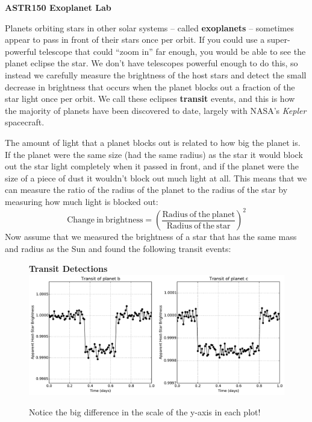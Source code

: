 \documentclass[12pt]{article}
\begin{document}

\begin{center}
\bf ASTR150 Exoplanet Lab
\end{center}

Planets orbiting stars in other solar systems -- called {\bf exoplanets} -- sometimes appear to pass in front of their stars once per orbit. If you could use a super-powerful telescope that could ``zoom in'' far enough, you would be able to see the planet eclipse the star. We don't have telescopes powerful enough to do this, so instead we carefully measure the brightness of the host stars and detect the small decrease in brightness that occurs when the planet blocks out a fraction of the star light once per orbit.  We call these eclipses {\bf transit} events, and this is how the majority of planets have been discovered to date, largely with NASA's {\it Kepler} spacecraft. 

The amount of light that a planet blocks out is related to how big the planet is. If the planet were the same size (had the same radius) as the star it would block out the star light completely when it passed in front, and if the planet were the size of a piece of dust it wouldn't block out much light at all. This means that we can measure the ratio of the radius of the planet to the radius of the star by measuring how much light is blocked out: 
\begin{equation}
\mathrm{Change~in~brightness} = \left( \frac{\mathrm{Radius~of~the~planet}}{\mathrm{Radius~of~the~star}} \right)^2 \label{eqn:depth}
\end{equation}
Now assume that we measured the brightness of a star that has the same mass and radius as the Sun and found the following transit events:
\begin{figure}[h!]
\centering
{\bf Transit Detections} \\
\includegraphics[scale=0.5]{plots/faketransit.pdf}
\caption{Notice the big difference in the scale of the y-axis in each plot!}
\end{figure}
\end{document}

